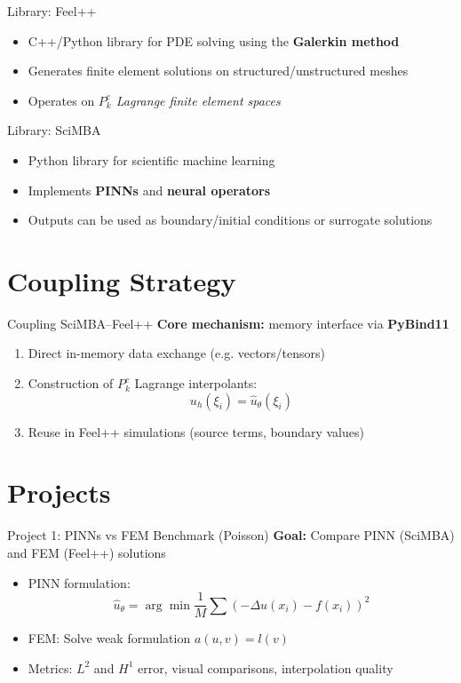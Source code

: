 \documentclass{beamer}
\begin{document}
\begin{frame}{Library: Feel++}
  \begin{itemize}
    \item C++/Python library for PDE solving using the \textbf{Galerkin method}
    \item Generates finite element solutions on structured/unstructured meshes
    \item Operates on \textit{\(P_k^c\) Lagrange finite element spaces}
  \end{itemize}
\end{frame}

\begin{frame}{Library: SciMBA}
  \begin{itemize}
    \item Python library for scientific machine learning
    \item Implements \textbf{PINNs} and \textbf{neural operators}
    \item Outputs can be used as boundary/initial conditions or surrogate solutions
  \end{itemize}
\end{frame}

\section{Coupling Strategy}
\begin{frame}{Coupling SciMBA–Feel++}
  \textbf{Core mechanism:} memory interface via \textbf{PyBind11}
  \begin{enumerate}
    \item Direct in-memory data exchange (e.g. vectors/tensors)
    \item Construction of \( P_k^c \) Lagrange interpolants:
    \[
      u_h(\xi_i) = \hat{u}_\theta(\xi_i)
    \]
    \item Reuse in Feel++ simulations (source terms, boundary values)
  \end{enumerate}
\end{frame}

\section{Projects}

\begin{frame}{Project 1: PINNs vs FEM Benchmark (Poisson)}
  \textbf{Goal:} Compare PINN (SciMBA) and FEM (Feel++) solutions
  \begin{itemize}
    \item PINN formulation:
    \[
      \hat{u}_\theta = \arg\min \frac{1}{M} \sum (-\Delta u(x_i) - f(x_i))^2
    \]
    \item FEM: Solve weak formulation \( a(u, v) = l(v) \)
    \item Metrics: $L^2$ and $H^1$ error, visual comparisons, interpolation quality
  \end{itemize}
\end{frame}
\end{document}
